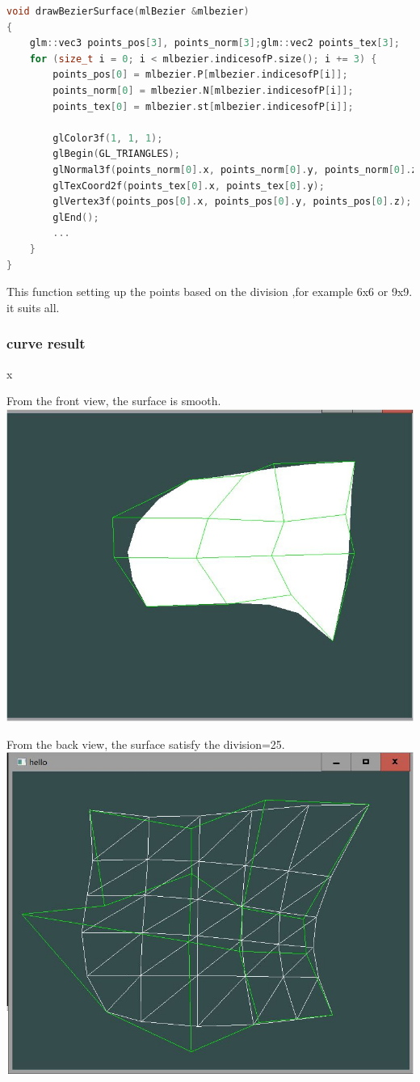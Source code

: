 \documentclass[acmtog]{acmart}
\begin{document}
\begin{lstlisting}[frame=single,breaklines=true,language=c++,basicstyle=\footnotesize\ttfamily]
void drawBezierSurface(mlBezier &mlbezier)
{
	glm::vec3 points_pos[3], points_norm[3];glm::vec2 points_tex[3];
	for (size_t i = 0; i < mlbezier.indicesofP.size(); i += 3) {
		points_pos[0] = mlbezier.P[mlbezier.indicesofP[i]];
		points_norm[0] = mlbezier.N[mlbezier.indicesofP[i]];
		points_tex[0] = mlbezier.st[mlbezier.indicesofP[i]];

		glColor3f(1, 1, 1);
		glBegin(GL_TRIANGLES);
		glNormal3f(points_norm[0].x, points_norm[0].y, points_norm[0].z);
		glTexCoord2f(points_tex[0].x, points_tex[0].y);
		glVertex3f(points_pos[0].x, points_pos[0].y, points_pos[0].z);
		glEnd();
		...
	}
}
\end{lstlisting}
This function setting up the points based on the division ,for example 6x6 or 9x9. it suits all.
\subsubsection{curve result}x
\par From the front view, the surface is smooth.\\
\includegraphics[scale=0.5]{0}
\par From the back view, the surface satisfy the division=25.\\
\includegraphics[scale=0.5]{1}
\end{document}
